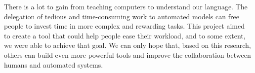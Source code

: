   There is a lot to gain from teaching computers to understand our language.
  The delegation of tedious and time-consuming work to automated models can
  free people to invest time in more complex and rewarding tasks. This project
  aimed to create a tool that could help people ease their workload, and to
  some extent, we were able to achieve that goal. We can only hope that, based
  on this research, others can build even more powerful tools and improve the
  collaboration between humans and automated systems. 

